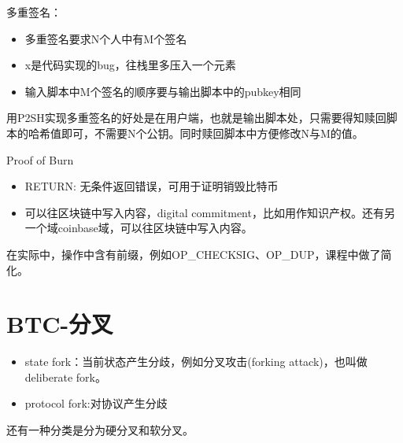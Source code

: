 \documentclass[10pt]{ctexart}
\begin{document}
多重签名：
\begin{itemize}
    \item 多重签名要求N个人中有M个签名
    \item x是代码实现的bug，往栈里多压入一个元素
    \item 输入脚本中M个签名的顺序要与输出脚本中的pubkey相同
\end{itemize}

用P2SH实现多重签名的好处是在用户端，也就是输出脚本处，只需要得知赎回脚本的哈希值即可，不需要N个公钥。同时赎回脚本中方便修改N与M的值。

Proof of Burn
\begin{itemize}
    \item RETURN: 无条件返回错误，可用于证明销毁比特币
    \item 可以往区块链中写入内容，digital commitment，比如用作知识产权。还有另一个域coinbase域，可以往区块链中写入内容。
\end{itemize}

在实际中，操作中含有前缀，例如OP\_CHECKSIG、OP\_DUP，课程中做了简化。

  
\section{BTC-分叉}
\begin{itemize}
    \item state fork：当前状态产生分歧，例如分叉攻击(forking attack)，也叫做deliberate fork。
    \item protocol fork:对协议产生分歧
\end{itemize}
还有一种分类是分为硬分叉和软分叉。
\end{document}
